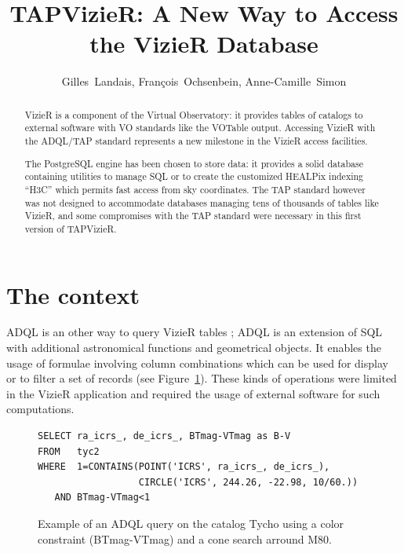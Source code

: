 
\resetcounters



\resetcounters

\title{TAPVizieR: A New Way to Access the VizieR Database}
\author{Gilles~Landais, Fran\c cois~Ochsenbein, Anne-Camille~Simon
}


\begin{abstract}
VizieR is a component of the Virtual Observatory: it provides tables of catalogs to external software with VO standards like the VOTable output. Accessing VizieR with the ADQL/TAP standard represents a new milestone in the VizieR access facilities.

The PostgreSQL engine has been chosen to store data: it provides a solid database containing utilities to manage SQL or to create the customized HEALPix indexing ``H3C'' which permits fast access from sky coordinates. The TAP standard however was not designed to accommodate databases managing tens of thousands of tables like VizieR, and some compromises with the TAP standard were necessary in this first version of TAPVizieR.
\end{abstract}

\section{The context}

ADQL \citep{adql_2011} is an other way to query VizieR tables \citep{ochsenbein_2000}; ADQL is an extension of SQL with additional astronomical functions and geometrical objects. It enables the usage of formulae involving column combinations which can be used for display or to filter a set of records (see Figure~\ref{P044:ADQLexample}). These kinds of operations were limited in the VizieR application and required the usage of external software for such computations.

\begin{figure}[!h] \center
\begin{footnotesize}
\begin{verbatim}
SELECT ra_icrs_, de_icrs_, BTmag-VTmag as B-V
FROM   tyc2
WHERE  1=CONTAINS(POINT('ICRS', ra_icrs_, de_icrs_),
                  CIRCLE('ICRS', 244.26, -22.98, 10/60.))
   AND BTmag-VTmag<1
\end{verbatim}\end{footnotesize}
\caption{Example of an ADQL query on the catalog Tycho using a color constraint (BTmag-VTmag) and a cone search arround M80.}\label{P044:ADQLexample}
\end{figure}

